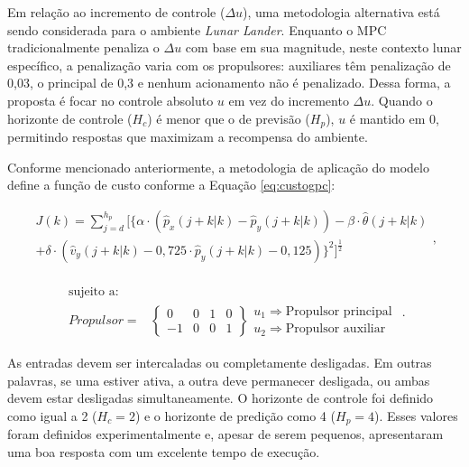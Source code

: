 \documentclass[12pt,           %
a4paper,                       %
openany,                       %
oneside,                       %
chapter=TITLE,                 %
english,                       %
spanish,                       %
brazil,                        %
sumario=tradicional]{abntex2}  %
\begin{document}
\begin{OnehalfSpace}
Em relação ao incremento de controle ($\Delta u$), uma metodologia alternativa está sendo considerada para o ambiente \textit{Lunar Lander}. Enquanto o MPC tradicionalmente penaliza o $\Delta u$ com base em sua magnitude, neste contexto lunar específico, a penalização varia com os propulsores: auxiliares têm penalização de 0,03, o principal de 0,3 e nenhum acionamento não é penalizado. Dessa forma, a proposta é focar no controle absoluto $u$ em vez do incremento $\Delta u$. Quando o horizonte de controle ($H_c$) é menor que o de previsão ($H_p$), $u$ é mantido em 0, permitindo respostas que maximizam a recompensa do ambiente.

Conforme mencionado anteriormente, a metodologia de aplicação do modelo define a função de custo conforme a Equação \ref{eq:custogpc}:

\begin{equation}
\label{eq:custogpc}
\begin{matrix}
    J(k) = \sum_{j=d}^{h_p}[\{\alpha\cdot (\hat{p}_x(j+k|k) - \hat{p}_y(j+k|k) )-\beta \cdot \hat{\theta}(j+k|k)\\
            +\delta \cdot  (\hat{v}_y(j+k|k)-0,725\cdot\hat{p}_y(j+k|k)-0,125)\}^2]^\frac{1}{2}\\
\end{matrix},
\end{equation}

\begin{equation*}
\begin{matrix}
  \text{sujeito a:} &  \\
  	Propulsor = & 
  	\left\{
  	\begin{matrix}
  	0  & 0 & 1 & 0 \\
   -1  & 0 & 0 & 1
	\end{matrix}  	
	\right\} 
	\begin{matrix}
  	u_1 \Rightarrow\text{Propulsor principal}\\
    u_2 \Rightarrow\text{Propulsor auxiliar}
	\end{matrix}
\end{matrix}.
\end{equation*}

As entradas devem ser intercaladas ou completamente desligadas. Em outras palavras, se uma estiver ativa, a outra deve permanecer desligada, ou ambas devem estar desligadas simultaneamente. O horizonte de controle foi definido como igual a 2 ($H_c=2$) e o horizonte de predição como 4 ($H_p=4$). Esses valores foram definidos experimentalmente e, apesar de serem pequenos, apresentaram uma boa resposta com um excelente tempo de execução.


\end{OnehalfSpace}
\end{document}
